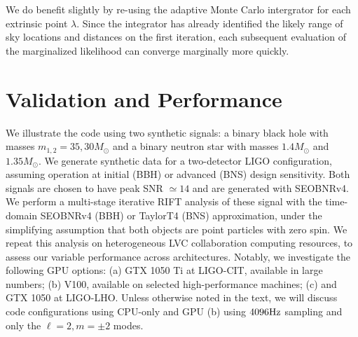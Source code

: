 \documentclass[twocolumn,prd,nofootinbib]{revtex4}
\newcommand\unit[1]{{\rm #1}}
\begin{document}
We do benefit slightly by re-using the adaptive Monte Carlo intergrator for each extrinsic point $\lambda$.  Since the
integrator has already identified the likely range of sky locations and distances on the first iteration, each
subsequent evaluation of the marginalized likelihood can converge marginally more quickly.



\section{Validation and Performance}
\label{sec:demo}

We illustrate the code using two synthetic signals: a binary black hole with masses $m_{1,2}=35,30 M_\odot$ and a binary
neutron star with masses $1.4 M_\odot$ and $1.35 M_\odot$.
We generate  synthetic data for a two-detector LIGO configuration, assuming operation at  initial (BBH) or advanced (BNS) design  sensitivity.
Both signals are chosen to have peak SNR $\simeq 14$ and are generated with SEOBNRv4.    We perform a multi-stage iterative RIFT analysis of these signal with the
time-domain SEOBNRv4 (BBH) or TaylorT4 (BNS) approximation, under the simplifying assumption that both objects are point particles with zero
spin.  We repeat this analysis on heterogeneous LVC collaboration computing resources, to assess our variable
performance across architectures.  Notably, we investigate the following GPU options: (a) GTX 1050 Ti at LIGO-CIT,
available in large numbers; (b) V100, available on selected high-performance machines; (c) and
GTX 1050 at LIGO-LHO.    Unless otherwise noted in the text, we will discuss code configurations using CPU-only and GPU (b) using
$4096\unit{Hz}$ sampling and only the  $\ell=2, m=\pm 2$ modes.
\end{document}
